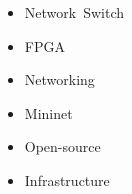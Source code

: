 \begin{changemargin}{5cm}{5cm}

\noindent
\begin{itemize}
  \item \mbox{Network Switch}
  \item FPGA
  \item Networking
  \item Mininet
  \item Open-source
  \item Infrastructure
\end{itemize}

\end{changemargin}
